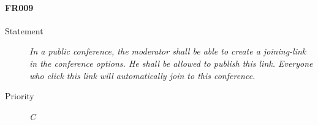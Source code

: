 \paragraph{FR009}
  \begin{description}
  \item [Statement] 
    \textit{ In a public conference, the moderator shall be able to create a joining-link in the conference options.
			He shall be allowed to publish this link.
			Everyone who click this link will automatically join to this conference.}
  \item [Priority] \textit{C}
\end{description}